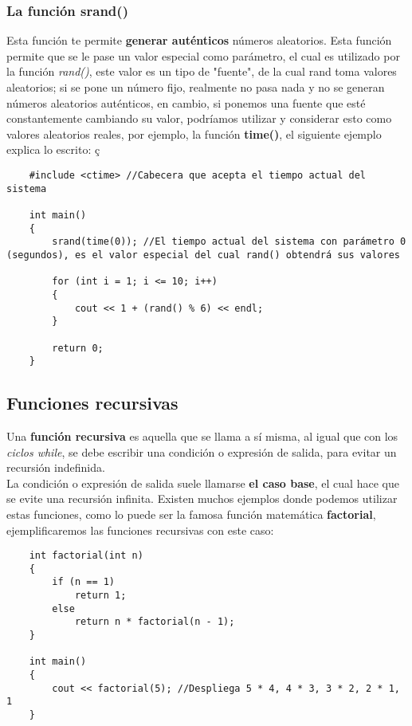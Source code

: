 \subsubsection{La función srand()}
Esta función te permite \textbf{generar auténticos} números aleatorios. Esta función permite que se le pase un valor especial como parámetro, el cual es utilizado por la función \textit{rand()}, este valor es un tipo de "fuente", de la cual rand toma valores aleatorios; si se pone un número fijo, realmente no pasa nada y no se generan números aleatorios auténticos, en cambio, si ponemos una fuente que esté constantemente cambiando su valor, podríamos utilizar y considerar esto como valores aleatorios reales, por ejemplo, la función \textbf{time()}, el siguiente ejemplo explica lo escrito:
ç\begin{lstlisting}
    #include <ctime> //Cabecera que acepta el tiempo actual del sistema

    int main()
    {
        srand(time(0)); //El tiempo actual del sistema con parámetro 0 (segundos), es el valor especial del cual rand() obtendrá sus valores
        
        for (int i = 1; i <= 10; i++)
        {
            cout << 1 + (rand() % 6) << endl;
        }
        
        return 0;
    }
\end{lstlisting}

\subsection{Funciones recursivas}
Una \textbf{función recursiva} es aquella que se llama a sí misma, al igual que con los \textit{ciclos while}, se debe escribir una condición o expresión de salida, para evitar un recursión indefinida.\\
La condición o expresión de salida suele llamarse \textbf{el caso base}, el cual hace que se evite una recursión infinita. Existen muchos ejemplos donde podemos utilizar estas funciones, como lo puede ser la famosa función matemática \textbf{factorial}, ejemplificaremos las funciones recursivas con este caso:
\begin{lstlisting}
    int factorial(int n)
    {
        if (n == 1)
            return 1;
        else
            return n * factorial(n - 1);
    }
    
    int main()
    {
        cout << factorial(5); //Despliega 5 * 4, 4 * 3, 3 * 2, 2 * 1, 1
    }
\end{lstlisting}
